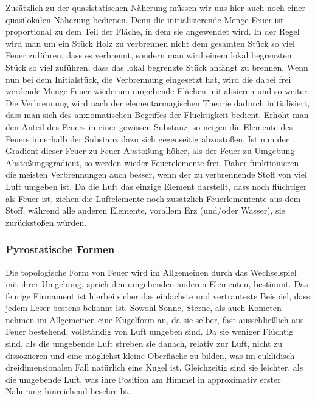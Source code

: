 \documentclass[a5paper,8pt]{book}
\begin{document}
Zusätzlich zu der quasistatischen Näherung müssen wir uns hier auch noch einer quasilokalen Näherung bedienen. Denn die 
initialisierende Menge Feuer ist proportional zu dem Teil der Fläche, in dem sie angewendet wird. In der Regel wird man um 
ein Stück Holz zu verbrennen nicht dem gesamten Stück so viel Feuer zuführen, dass es verbrennt, sondern man wird einem 
lokal begrenzten Stück so viel zuführen, dass das lokal begrenzte Stück anfängt zu brennen. Wenn nun bei dem Initialstück, 
die Verbrennung eingesetzt hat, wird die dabei frei werdende Menge Feuer wiederum umgebende Flächen initialisieren und so 
weiter.
Die Verbrennung wird nach der elementarmagischen Theorie dadurch initialisiert, dass man sich des anxiomatischen Begriffes 
der Flüchtigkeit bedient. Erhöht man den Anteil des Feuers in einer gewissen Substanz, so neigen die Elemente des Feuers 
innerhalb der Substanz dazu sich gegenseitig abzustoßen. Ist nun der Gradient dieser Feuer zu Feuer Abstoßung höher, als 
der Feuer zu Umgebung Abstoßungsgradient, so werden wieder Feuerelemente frei. Daher funktionieren die meisten 
Verbrennungen auch besser, wenn der zu verbrennende Stoff von viel Luft umgeben ist. Da die Luft das einzige Element 
darstellt, dass noch flüchtiger als Feuer ist, ziehen die Luftelemente noch zusätzlich Feuerlementente aus dem Stoff,
während alle anderen Elemente, vorallem Erz (und/oder Wasser), sie zurückstoßen würden.



\subsubsection{Pyrostatische Formen}

Die topologische Form von Feuer wird im Allgemeinen durch das Wechselspiel mit ihrer Umgebung, sprich den umgebenden anderen 
Elementen, bestimmt.
Das feurige Firmament ist hierbei sicher das einfachste und vertrauteste Beispiel, dass jedem Leser bestens bekannt ist. 
Sowohl Sonne, Sterne, als auch Kometen nehmen im Allgemeinen eine Kugelform an, da sie selber, fast ausschließlich aus 
Feuer bestehend, vollständig von Luft umgeben sind. Da sie weniger Flüchtig sind, als die umgebende Luft streben sie 
danach, relativ zur Luft, nicht zu dissoziieren und eine möglichst kleine Oberfläche zu bilden, was im euklidisch 
dreidimensionalen Fall natürlich eine Kugel ist.
Gleichzeitig sind sie leichter, als die umgebende Luft, was ihre Position am Himmel in approximativ erster Näherung 
hinreichend beschreibt.\\
\end{document}
